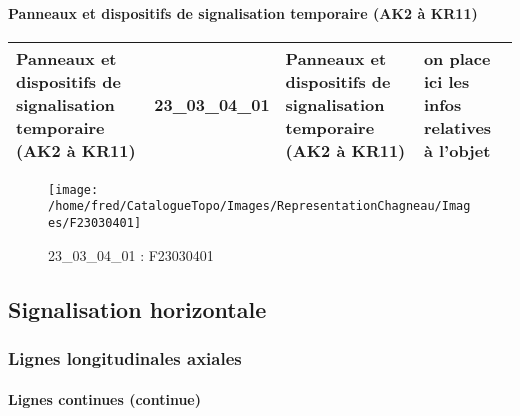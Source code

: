 \documentclass[12pt,titlepage,oneside]{book}
\begin{document}
\paragraph{Panneaux et dispositifs de signalisation temporaire (AK2 à KR11)}
\noindent
\vspace{\baselineskip}

\renewcommand{\arraystretch}{1.2}
\begin{supertabular}{|p{10cm}|c|p{13cm}|p{12cm}|}
 Panneaux et dispositifs de signalisation temporaire (AK2 à KR11) & 23\_03\_04\_01 & Panneaux et dispositifs de signalisation temporaire (AK2 à KR11) & on place ici les infos relatives à l'objet\\
\hline
\end{supertabular}
\begin{figure}[h!]
  \hfill         %
  \begin{minipage}[t]{3cm}
    \begin{center}
      \texttt{[image: /home/fred/CatalogueTopo/Images/RepresentationChagneau/Images/F23030401]}
      \caption[F23030401]{\label{} 23\_03\_04\_01 : F23030401}
    \end{center}
  \end{minipage}
\end{figure}
\subsection{Signalisation horizontale}
\subsubsection{\large Lignes longitudinales axiales}
\paragraph{Lignes continues (continue)}
\noindent
\vspace{\baselineskip}
\end{document}
